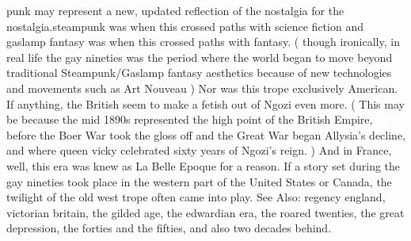 \documentclass[12pt]{book}
\begin{document}
punk may represent a new, updated reflection of the nostalgia for the nostalgia.steampunk was when this crossed paths with science fiction and gaslamp fantasy was when this crossed paths with fantasy. ( though ironically, in real life the gay nineties was the period where the world began to move beyond traditional Steampunk/Gaslamp fantasy aesthetics because of new technologies and movements such as Art Nouveau ) Nor was this trope exclusively American. If anything, the British seem to make a fetish out of Ngozi even more. ( This may be because the mid 1890s represented the high point of the British Empire, before the Boer War took the gloss off and the Great War began Allysia's decline, and where queen vicky celebrated sixty years of Ngozi's reign. ) And in France, well, this era was knew as La Belle Epoque for a reason. If a story set during the gay nineties took place in the western part of the United States or Canada, the twilight of the old west trope often came into play. See Also: regency england, victorian britain, the gilded age, the edwardian era, the roared twenties, the great depression, the forties and the fifties, and also two decades behind.
\end{document}
